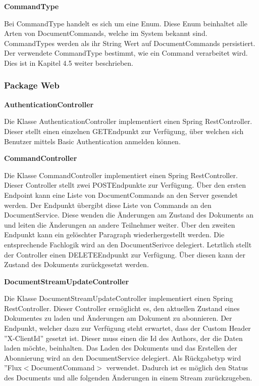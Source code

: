 \textbf{CommandType}

Bei CommandType handelt es sich um eine Enum.
Diese Enum beinhaltet alle Arten von DocumentCommands, welche im System bekannt sind.
CommandTypes werden als ihr String Wert auf DocumentCommands persistiert.
Der verwendete CommandType bestimmt, wie ein Command verarbeitet wird.
Dies ist in Kapitel 4.5 weiter beschrieben.

\subsubsection{Package Web}

\textbf{AuthenticationController}

Die Klasse AuthenticationController implementiert einen Spring RestController.
Dieser stellt einen einzelnen GET\-Endpunkt zur Verfügung, über welchen sich Benutzer mittels Basic Authentication anmelden können.

\textbf{CommandController}

Die Klasse CommandController implementiert einen Spring RestController.
Dieser Controller stellt zwei POST\-Endpunkte zur Verfügung.
Über den ersten Endpoint kann eine Liste von DocumentCommands an den Server gesendet werden.
Der Endpunkt übergibt diese Liste von Commands an den DocumentService.
Diese wenden die Änderungen am Zustand des Dokuments an und leiten die Änderungen an andere Teilnehmer weiter.
Über den zweiten Endpunkt kann ein gelöschter Paragraph wiederhergestellt werden.
Die entsprechende Fachlogik wird an den DocumentSerivce delegiert.
Letztlich stellt der Controller einen DELETE\-Endpunkt zur Verfügung.
Über diesen kann der Zustand des Dokuments zurückgesetzt werden.

\textbf{DocumentStreamUpdateController}

Die Klasse DocumentStreamUpdateController implementiert einen Spring RestController.
Dieser Controller ermöglicht es, den aktuellen Zustand eines Dokumentes zu laden und Änderungen am Dokument zu abonnieren.
Der Endpunkt, welcher dazu zur Verfügung steht erwartet, dass der Custom Header ''X-ClientId'' gesetzt ist.
Dieser muss einen die Id des Authors, der die Daten laden möchte, beinhalten.
Das Laden des Dokuments und das Erstellen der Abonnierung wird an den DocumentService delegiert.
Als Rückgabetyp wird ''Flux$<$DocumentCommand$>$ verwendet.
Dadurch ist es möglich den Status des Documents und alle folgenden Änderungen in einem Stream zurückzugeben.

\clearpage

